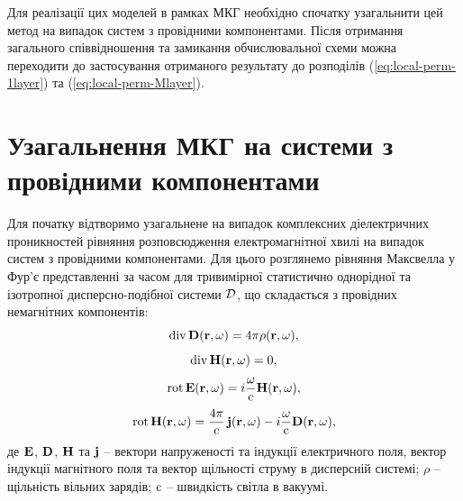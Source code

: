 \documentclass[14pt,twoside]{vakthesis}
\begin{document}
Для реалізації цих моделей в рамках МКГ необхідно спочатку узагальнити цей метод на випадок систем з провідними компонентами. Після отримання загального співвідношення та замикання обчислювальної схеми можна переходити до застосування отриманого результату до розподілів (\ref{eq:local-perm-1layer}) та (\ref{eq:local-perm-Mlayer}).


\section{Узагальнення МКГ на системи з провідними компонентами}\label{sec:CGA_theory}

Для початку відтворимо узагальнене на випадок комплексних діелектричних проникностей рівняння  розповсюдження електромагнітної хвилі на випадок систем з провідними компонентами. 
Для цього розглянемо рівняння Максвелла у Фур'є представленні за часом для тривимірної статистично однорідної та ізотропної дисперсно-подібної системи $\cal{D}$, що складається з провідних немагнітних компонентів:
\begin{equation}\label{eq:MEdiv-D}
{\rm div}\,{\bf D}({\bf r}, \omega) = 4 \pi \rho({\bf r}, \omega),
\end{equation}
\begin{equation}\label{eq:MEdiv-H}
{\rm div}\,{\bf H}({\bf r}, \omega) = 0,
\end{equation}
\begin{equation}\label{eq:MErot-D}
{\rm rot}\,{\bf E}({\bf r}, \omega) = i\frac{\omega}{\rm c} {\bf H}({\bf r}, \omega), 
\end{equation}
\begin{equation}\label{eq:MErot-H}
{\rm rot}\,{\bf H}({\bf r}, \omega) = \frac{4\pi}{\rm c}\,{\bf j}({\bf r}, \omega) - i\frac{\omega}{\rm c} {\bf D}({\bf r}, \omega),
\end{equation}
де ${\bf E}$, ${\bf D}$, ${\bf H}$ та ${\bf j}$ -- вектори напруженості та індукції електричного поля, вектор індукції магнітного поля та вектор щільності струму в дисперсній системі; $\rho$ -- щільність вільних зарядів; ${\rm c}$ -- швидкість світла в вакуумі. 
\end{document}
